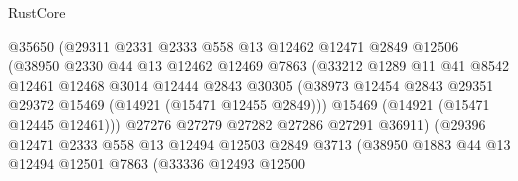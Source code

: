 \begin{lexlean}{RustCore}
\begin{coremodule}
                              @35650
                              (@29311
                                @2331
                                @2333
                                @558
                                @13
                                @12462
                                @12471
                                @2849
                                @12506
                                (@38950
                                  @2330
                                  @44
                                  @13
                                  @12462
                                  @12469
                                  @7863
                                  (@33212
                                    @1289
                                    @11
                                    @41
                                    @8542
                                    @12461
                                    @12468
                                    @3014
                                    @12444
                                    @2843
                                    @30305
                                    (@38973
                                      @12454
                                      @2843
                                      @29351
                                      @29372
                                      @15469
                                      (@14921 (@15471 @12455 @2849)))
                                    @15469
                                    (@14921 (@15471 @12445 @12461)))
                                  @27276
                                  @27279
                                  @27282
                                  @27286
                                  @27291
                                  @36911)
                                (@29396
                                  @12471
                                  @2333
                                  @558
                                  @13
                                  @12494
                                  @12503
                                  @2849
                                  @3713
                                  (@38950
                                    @1883
                                    @44
                                    @13
                                    @12494
                                    @12501
                                    @7863
                                    (@33336
                                      @12493
                                      @12500

\end{coremodule}
\end{lexlean}
